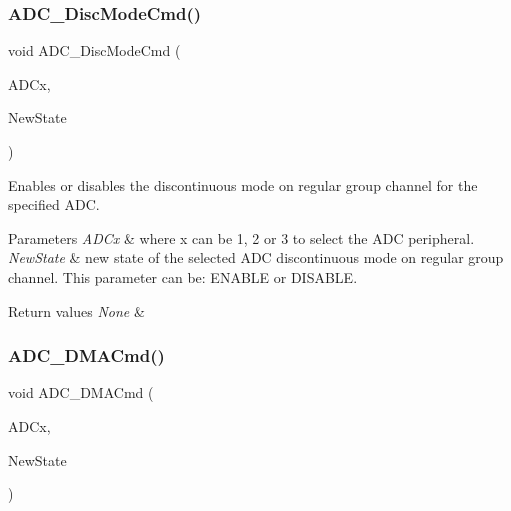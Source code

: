 \subsubsection{\texorpdfstring{ADC\_DiscModeCmd()}{ADC\_DiscModeCmd()}}
{\footnotesize\ttfamily void A\+D\+C\+\_\+\+Disc\+Mode\+Cmd (\begin{DoxyParamCaption}\item[{\mbox{\hyperlink{struct_a_d_c___type_def}{A\+D\+C\+\_\+\+Type\+Def}} $\ast$}]{A\+D\+Cx,  }\item[{\mbox{\hyperlink{group___exported__types_gac9a7e9a35d2513ec15c3b537aaa4fba1}{Functional\+State}}}]{New\+State }\end{DoxyParamCaption})}



Enables or disables the discontinuous mode on regular group channel for the specified A\+DC. 


\begin{DoxyParams}{Parameters}
{\em A\+D\+Cx} & where x can be 1, 2 or 3 to select the A\+DC peripheral. \\
\hline
{\em New\+State} & new state of the selected A\+DC discontinuous mode on regular group channel. This parameter can be\+: E\+N\+A\+B\+LE or D\+I\+S\+A\+B\+LE. \\
\hline
\end{DoxyParams}

\begin{DoxyRetVals}{Return values}
{\em None} & \\
\hline
\end{DoxyRetVals}
\mbox{\label{group___a_d_c___private___functions_gac5881d5995818001584b27b137a8dbcb}} 
\subsubsection{\texorpdfstring{ADC\_DMACmd()}{ADC\_DMACmd()}}
{\footnotesize\ttfamily void A\+D\+C\+\_\+\+D\+M\+A\+Cmd (\begin{DoxyParamCaption}\item[{\mbox{\hyperlink{struct_a_d_c___type_def}{A\+D\+C\+\_\+\+Type\+Def}} $\ast$}]{A\+D\+Cx,  }\item[{\mbox{\hyperlink{group___exported__types_gac9a7e9a35d2513ec15c3b537aaa4fba1}{Functional\+State}}}]{New\+State }\end{DoxyParamCaption})}



